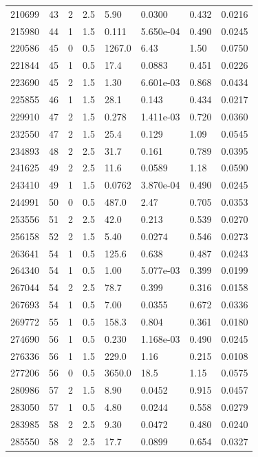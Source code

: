 \documentclass[preview]{standalone}
\begin{document}
{{{\begin{tabular}{L{1.2cm}C{1.2cm} C{0.3cm}C{0.5cm} C{1.4cm}C{1.4cm} C{1.4cm}C{1.4cm}}
  210699  &    43  & 2     & 2.5 &  5.90  & 0.0300  & 0.432 &  0.0216   \\ 
  215980  &    44  & 1     & 1.5 &  0.111  & 5.650e-04  & 0.490 &  0.0245   \\ 
  220586  &    45  & 0     & 0.5 &  1267.0  & 6.43  & 1.50 &  0.0750   \\ 
  221844  &    45  & 1     & 0.5 &  17.4  & 0.0883  & 0.451 &  0.0226   \\ 
  223690  &    45  & 2     & 1.5 &  1.30  & 6.601e-03  & 0.868 &  0.0434   \\ 
  225855  &    46  & 1     & 1.5 &  28.1  & 0.143  & 0.434 &  0.0217   \\ 
  229910  &    47  & 2     & 1.5 &  0.278  & 1.411e-03  & 0.720 &  0.0360   \\ 
  232550  &    47  & 2     & 1.5 &  25.4  & 0.129  & 1.09 &  0.0545   \\ 
  234893  &    48  & 2     & 2.5 &  31.7  & 0.161  & 0.789 &  0.0395   \\ 
  241625  &    49  & 2     & 2.5 &  11.6  & 0.0589  & 1.18 &  0.0590   \\ 
  243410  &    49  & 1     & 1.5 &  0.0762  & 3.870e-04  & 0.490 &  0.0245   \\ 
  244991  &    50  & 0     & 0.5 &  487.0  & 2.47  & 0.705 &  0.0353   \\ 
  253556  &    51  & 2     & 2.5 &  42.0  & 0.213  & 0.539 &  0.0270   \\ 
  256158  &    52  & 2     & 1.5 &  5.40  & 0.0274  & 0.546 &  0.0273   \\ 
  263641  &    54  & 1     & 0.5 &  125.6  & 0.638  & 0.487 &  0.0243   \\ 
  264340  &    54  & 1     & 0.5 &  1.00  & 5.077e-03  & 0.399 &  0.0199   \\ 
  267044  &    54  & 2     & 2.5 &  78.7  & 0.399  & 0.316 &  0.0158   \\ 
  267693  &    54  & 1     & 0.5 &  7.00  & 0.0355  & 0.672 &  0.0336   \\ 
  269772  &    55  & 1     & 0.5 &  158.3  & 0.804  & 0.361 &  0.0180   \\ 
  274690  &    56  & 1     & 0.5 &  0.230  & 1.168e-03  & 0.490 &  0.0245   \\ 
  276336  &    56  & 1     & 1.5 &  229.0  & 1.16  & 0.215 &  0.0108   \\ 
  277206  &    56  & 0     & 0.5 &  3650.0  & 18.5  & 1.15 &  0.0575   \\ 
  280986  &    57  & 2     & 1.5 &  8.90  & 0.0452  & 0.915 &  0.0457   \\ 
  283050  &    57  & 1     & 0.5 &  4.80  & 0.0244  & 0.558 &  0.0279   \\ 
  283985  &    58  & 2     & 2.5 &  9.30  & 0.0472  & 0.480 &  0.0240   \\ 
  285550  &    58  & 2     & 2.5 &  17.7  & 0.0899  & 0.654 &  0.0327   \\ 
\hline 
\end{tabular} 

}}}
\end{document}
